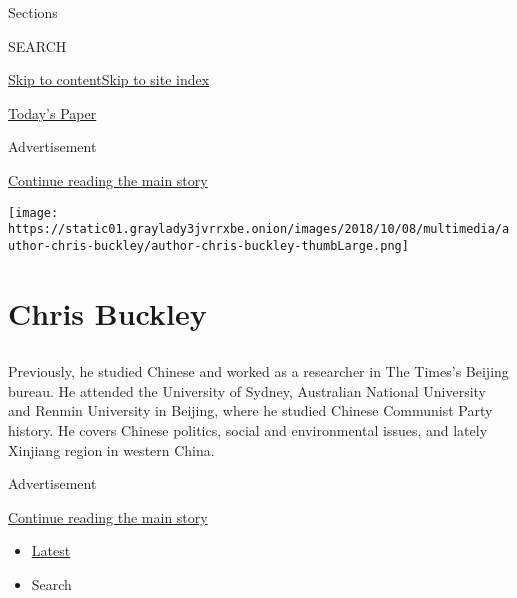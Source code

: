 Sections

SEARCH

\protect\hyperlink{site-content}{Skip to
content}\protect\hyperlink{site-index}{Skip to site index}

\href{https://myaccount.nytimes3xbfgragh.onion/auth/login?response_type=cookie\&client_id=vi}{}

\href{https://www.nytimes3xbfgragh.onion/section/todayspaper}{Today's
Paper}

Advertisement

\protect\hyperlink{after-top}{Continue reading the main story}

\texttt{[image: https://static01.graylady3jvrrxbe.onion/images/2018/10/08/multimedia/author-chris-buckley/author-chris-buckley-thumbLarge.png]}

\hypertarget{chris-buckley}{%
\section{Chris Buckley}\label{chris-buckley}}

\subsection{}

Previously, he studied Chinese and worked as a researcher in The Times's
Beijing bureau. He attended the University of Sydney, Australian
National University and Renmin University in Beijing, where he studied
Chinese Communist Party history. He covers Chinese politics, social and
environmental issues, and lately Xinjiang region in western China.

Advertisement

\protect\hyperlink{after-mid1}{Continue reading the main story}

\begin{itemize}
\tightlist
\item
  \protect\hyperlink{stream-panel}{Latest}
\item
  Search
\end{itemize}

